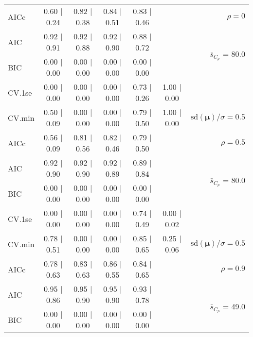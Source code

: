 \documentclass[12pt]{article}
\newcommand{\mr}[1]{\mathrm{#1}}
\newcommand{\bm}[1]{\mathbf{#1}}
\begin{document}
\begin{table}[p]
\begin{center}
\begin{tabular}{l*{5}{c}|r}
AICc & 0.60 $\mid$ 0.24 & 0.82 $\mid$ 0.38 & 0.84 $\mid$ 0.51 & 0.83 $\mid$ 0.46 & & $\rho=0$ \\
AIC & 0.92 $\mid$ 0.91 & 0.92 $\mid$ 0.88 & 0.92 $\mid$ 0.90 & 0.88 $\mid$ 0.72 & & \multirow{2}{*}{$\bar{s}_{C_p}$ = 80.0} \\
BIC & 0.00 $\mid$ 0.00 & 0.00 $\mid$ 0.00 & 0.00 $\mid$ 0.00 & 0.00 $\mid$ 0.00 & & \\
 \hline 
CV.1se & 0.00 $\mid$ 0.00 & 0.00 $\mid$ 0.00 & 0.00 $\mid$ 0.00 & 0.73 $\mid$ 0.26 & 1.00 $\mid$ 0.00 &\\
CV.min & 0.50 $\mid$ 0.09 & 0.00 $\mid$ 0.00 & 0.00 $\mid$ 0.00 & 0.79 $\mid$ 0.50 & 1.00 $\mid$ 0.00 &  $\mr{sd}(\bm{\mu})/\sigma=0.5$ \\
AICc & 0.56 $\mid$ 0.09 & 0.81 $\mid$ 0.56 & 0.82 $\mid$ 0.46 & 0.79 $\mid$ 0.50 & & $\rho=0.5$ \\
AIC & 0.92 $\mid$ 0.90 & 0.92 $\mid$ 0.90 & 0.92 $\mid$ 0.89 & 0.89 $\mid$ 0.84 & & \multirow{2}{*}{$\bar{s}_{C_p}$ = 80.0} \\
BIC & 0.00 $\mid$ 0.00 & 0.00 $\mid$ 0.00 & 0.00 $\mid$ 0.00 & 0.00 $\mid$ 0.00 & & \\
 \hline 
CV.1se & 0.00 $\mid$ 0.00 & 0.00 $\mid$ 0.00 & 0.00 $\mid$ 0.00 & 0.74 $\mid$ 0.49 & 0.00 $\mid$ 0.02 &\\
CV.min & 0.78 $\mid$ 0.51 & 0.00 $\mid$ 0.00 & 0.00 $\mid$ 0.00 & 0.85 $\mid$ 0.65 & 0.25 $\mid$ 0.06 &  $\mr{sd}(\bm{\mu})/\sigma=0.5$ \\
AICc & 0.78 $\mid$ 0.63 & 0.83 $\mid$ 0.63 & 0.86 $\mid$ 0.55 & 0.84 $\mid$ 0.65 & & $\rho=0.9$ \\
AIC & 0.95 $\mid$ 0.86 & 0.95 $\mid$ 0.90 & 0.95 $\mid$ 0.90 & 0.93 $\mid$ 0.78 & & \multirow{2}{*}{$\bar{s}_{C_p}$ = 49.0} \\
BIC & 0.00 $\mid$ 0.00 & 0.00 $\mid$ 0.00 & 0.00 $\mid$ 0.00 & 0.00 $\mid$ 0.00 & & \\
 \hline 
 \end{tabular}
\end{center}
\vspace{-1cm}
\end{table}
\end{document}

